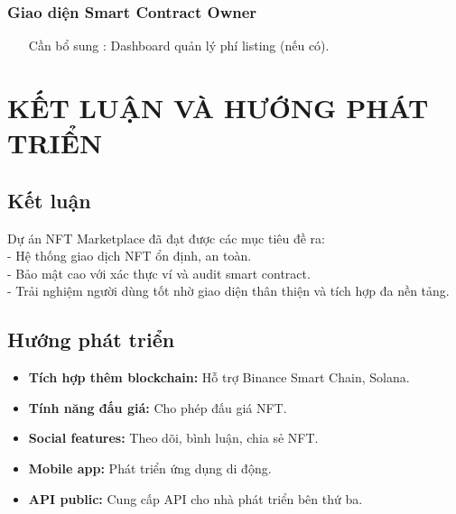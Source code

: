 \documentclass[a4paper,12pt]{report}
\begin{document}
\subsection{Giao diện Smart Contract Owner}
\begin{itemize}
    \item [Cần bổ sung]: Dashboard quản lý phí listing (nếu có).
\end{itemize}

\chapter{KẾT LUẬN VÀ HƯỚNG PHÁT TRIỂN}

\section{Kết luận}
Dự án NFT Marketplace đã đạt được các mục tiêu đề ra: \\
- Hệ thống giao dịch NFT ổn định, an toàn. \\
- Bảo mật cao với xác thực ví và audit smart contract. \\
- Trải nghiệm người dùng tốt nhờ giao diện thân thiện và tích hợp đa nền tảng.

\section{Hướng phát triển}
\begin{itemize}
    \item \textbf{Tích hợp thêm blockchain:} Hỗ trợ Binance Smart Chain, Solana.
    \item \textbf{Tính năng đấu giá:} Cho phép đấu giá NFT.
    \item \textbf{Social features:} Theo dõi, bình luận, chia sẻ NFT.
    \item \textbf{Mobile app:} Phát triển ứng dụng di động.
    \item \textbf{API public:} Cung cấp API cho nhà phát triển bên thứ ba.
\end{itemize}
\end{document}
